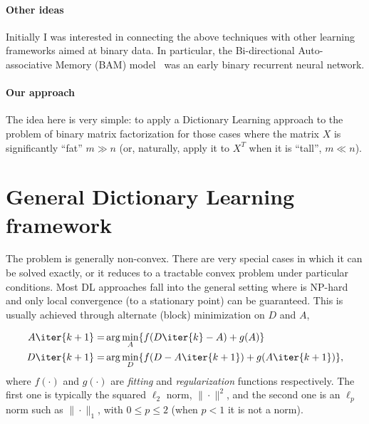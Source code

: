 \documentclass[a4paper,11pt]{report}
\begin{document}
\paragraph{Other ideas} Initially I was interested in connecting the above techniques with other learning frameworks aimed at binary data. In particular, the Bi-directional Auto-associative Memory (BAM) model~\cite{bam} was an early binary recurrent neural network.


\paragraph{Our approach} The idea here is very simple: to apply a Dictionary Learning approach to the problem of binary matrix factorization for those cases where the matrix $X$ is significantly ``fat'' $m \gg n$ (or, naturally, apply it to $X^T$ when it is ``tall'', $m \ll n$). 

\section{General Dictionary Learning framework}

The problem  is generally non-convex. There are very special cases in which it can be solved exactly, or it reduces to a tractable convex problem under particular conditions. Most DL approaches fall into the general setting where  is NP-hard and only local convergence (to a stationary point) can be guaranteed. This is usually achieved through alternate (block) minimization on $D$ and $A$,

\begin{eqnarray}
A\iter{k+1} =& \arg\min_{A} \{ f(D\iter{k}-A) + g(A) \} \\
D\iter{k+1} =& \arg\min_{D} \{ f(D-A\iter{k+1}) + g(A\iter{k+1}) \},
\label{eq:dl}
\end{eqnarray}
where $f(\cdot)$ and $g(\cdot)$ are \emph{fitting} and \emph{regularization} functions respectively. The first one is typically the squared $\ell_2$ norm, $\|\cdot\|^2$, and the second one is an $\ell_p$ norm such as $\|\cdot\|_1$, with $0 \leq p \leq 2$ (when $p < 1$ it is not a norm).

 
\cite{ksvd}



\end{document}

